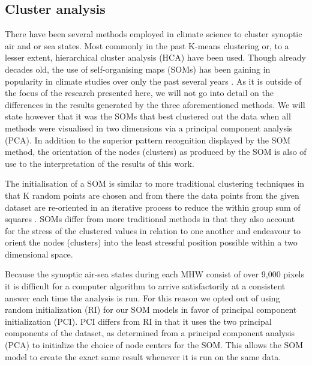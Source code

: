 \documentclass[a4paper,10pt,review]{elsarticle}
\begin{document}
\subsection{Cluster analysis}
There have been several methods employed in climate science to cluster synoptic air and or sea states. Most commonly in the past K-means clustering \citep[e.g.]{Corte-Real1998, Burrough2001, Kumar2011} or, to a lesser extent, hierarchical cluster analysis (HCA) \citep[e.g.][]{Unal2003} have been used. Though already decades old, the use of self-organising maps (SOMs) has been gaining in popularity in climate studies over only the past several years \citep[e.g.][]{Cavazos2000, Hewitson2002, Morioka2010}. As it is outside of the focus of the research presented here, we will not go into detail on the differences in the results generated by the three aforementioned methods. We will state however that it was the SOMs that best clustered out the data when all methods were visualised in two dimensions via a principal component analysis (PCA). In addition to the superior pattern recognition displayed by the SOM method, the orientation of the nodes (clusters) as produced by the SOM is also of use to the interpretation of the results of this work.

The initialisation of a SOM is similar to more traditional clustering techniques in that K random points are chosen and from there the data points from the given dataset are re-oriented in an iterative process to reduce the within group sum of squares \citep{Jain2010}. SOMs differ from more traditional methods in that they also account for the stress of the clustered values in relation to one another and endeavour to orient the nodes (clusters) into the least stressful position possible within a two dimensional space. 

Because the synoptic air-sea states during each MHW consist of over 9,000 pixels it is difficult for a computer algorithm to arrive satisfactorily at a consistent answer each time the analysis is run. For this reason we opted out of using random initialization (RI) for our SOM models in favor of principal component initialization (PCI). PCI differs from RI in that it uses the two principal components of the dataset, as determined from a principal component analysis (PCA) to initialize the choice of node centers for the SOM. This allows the SOM model to create the exact same result whenever it is run on the same data.
\end{document}

